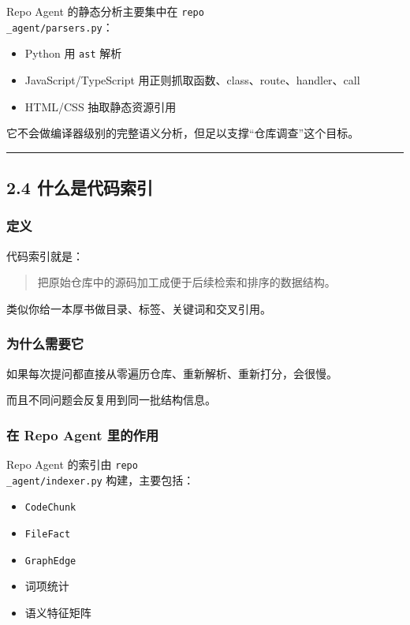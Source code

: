 \documentclass[UTF8,12pt,openany]{ctexbook}
\begin{document}
Repo Agent 的静态分析主要集中在 \texttt{repo\\_agent/parsers.py}：\par

\begin{itemize}
\item Python 用 \texttt{ast} 解析
\item JavaScript/TypeScript 用正则抓取函数、class、route、handler、call
\item HTML/CSS 抽取静态资源引用
\end{itemize}

它不会做编译器级别的完整语义分析，但足以支撑“仓库调查”这个目标。\par

\hrule

\subsection{2.4 什么是代码索引}

\subsubsection{定义}

代码索引就是：\par

\begin{quote}
把原始仓库中的源码加工成便于后续检索和排序的数据结构。
\end{quote}

类似你给一本厚书做目录、标签、关键词和交叉引用。\par

\subsubsection{为什么需要它}

如果每次提问都直接从零遍历仓库、重新解析、重新打分，会很慢。  \par
而且不同问题会反复用到同一批结构信息。\par

\subsubsection{在 Repo Agent 里的作用}

Repo Agent 的索引由 \texttt{repo\\_agent/indexer.py} 构建，主要包括：\par

\begin{itemize}
\item \texttt{CodeChunk}
\item \texttt{FileFact}
\item \texttt{GraphEdge}
\item 词项统计
\item 语义特征矩阵
\end{itemize}
\end{document}
